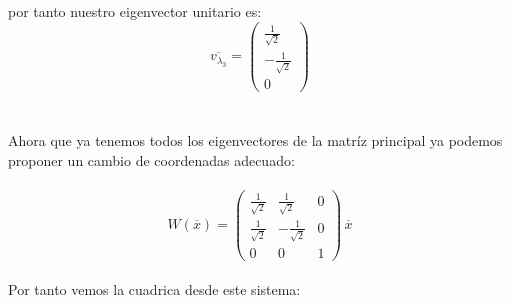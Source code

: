 \documentclass[11pt,letterpaper]{article}
\begin{document}
    por tanto
    nuestro eigenvector unitario es:
    \,\\
    \begin{equation*}
        \overline{v_{\lambda_3}}=\begin{pmatrix}
                \frac{1}{\sqrt{2}}\\
                -\frac{1}{\sqrt{2}}\\
                0
                \end{pmatrix}
    \end{equation*}\,\\
    \,\\
    Ahora que ya tenemos todos los eigenvectores de la matr\'iz principal ya podemos proponer un cambio de coordenadas adecuado:\,\\
    \,\\
    \begin{equation*}
        W(\overline{x})=
        \begin{pmatrix}
                \frac{1}{\sqrt{2}} & \frac{1}{\sqrt{2}} & 0\\
                 \frac{1}{\sqrt{2}}&- \frac{1}{\sqrt{2}}& 0\\
                 0& 0 &1
                \end{pmatrix}\,\overline{x}
    \end{equation*}\,\\
    Por tanto vemos la cuadrica desde este sistema:\,\\
    \,\\
\end{document}

